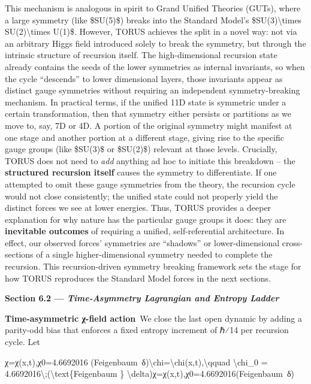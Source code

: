 \documentclass[
]{article}
\begin{document}
This mechanism is analogous in spirit to Grand Unified Theories (GUTs),
where a large symmetry (like \$SU(5)\$) breaks into the Standard Model's
\$SU(3)\textbackslash times SU(2)\textbackslash times U(1)\$. However,
TORUS achieves the split in a novel way: not via an arbitrary Higgs
field introduced solely to break the symmetry, but through the intrinsic
structure of recursion itself\hspace{0pt}. The high-dimensional
recursion state already contains the seeds of the lower symmetries as
internal invariants, so when the cycle ``descends'' to lower dimensional
layers, those invariants appear as distinct gauge symmetries without
requiring an independent symmetry-breaking mechanism\hspace{0pt}. In
practical terms, if the unified 11D state is symmetric under a certain
transformation, then that symmetry either persists or partitions as we
move to, say, 7D or 4D. A portion of the original symmetry might
manifest at one stage and another portion at a different stage, giving
rise to the specific gauge groups (like \$SU(3)\$ or \$SU(2)\$) relevant
at those levels\hspace{0pt}. Crucially, TORUS does not need to
\emph{add} anything ad hoc to initiate this breakdown -- the
\textbf{structured recursion itself} causes the symmetry to
differentiate. If one attempted to omit these gauge symmetries from the
theory, the recursion cycle would not close consistently; the unified
state could not properly yield the distinct forces we see at lower
energies\hspace{0pt}. Thus, TORUS provides a deeper explanation for why
nature has the particular gauge groups it does: they are
\textbf{inevitable outcomes} of requiring a unified, self-referential
architecture. In effect, our observed forces' symmetries are ``shadows''
or lower-dimensional cross-sections of a single higher-dimensional
symmetry needed to complete the recursion\hspace{0pt}. This
recursion-driven symmetry breaking framework sets the stage for how
TORUS reproduces the Standard Model forces in the next sections.

\textbf{Section 6.2 --- \emph{Time-Asymmetry Lagrangian and Entropy
Ladder}}

\textbf{Time-asymmetric χ-field action} We close the last open dynamic
by adding a parity-odd bias that enforces a fixed entropy increment of
ℏ⁄14 per recursion cycle. Let

χ=χ(x,t),χ0=4.6692016  (Feigenbaum~δ)\textbackslash chi=\textbackslash chi(x,t),\textbackslash qquad
\textbackslash chi\_0 =
4.6692016\textbackslash;(\textbackslash text\{Feigenbaum \}
\textbackslash delta)χ=χ(x,t),χ0\hspace{0pt}=4.6692016(Feigenbaum~δ)
\end{document}

